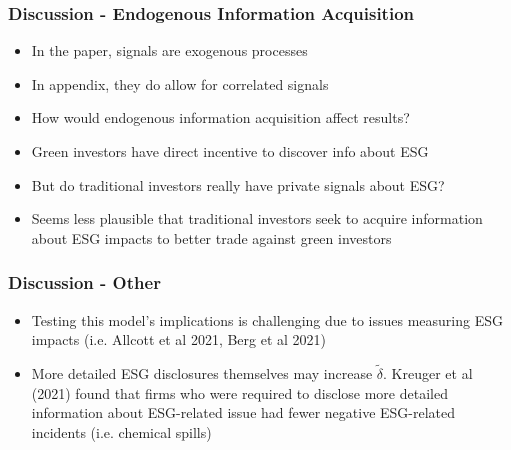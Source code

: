 \documentclass{beamer}
\begin{document}
\begin{frame}
\frametitle{Discussion - Endogenous Information Acquisition}
\begin{itemize}[<+->]
\item In the paper, signals are exogenous processes
\bigskip
\item In appendix, they do allow for correlated signals
\bigskip
\item How would endogenous information acquisition affect results?
\bigskip
\item Green investors have direct incentive to discover info about ESG
\bigskip
\item But do traditional investors really have private signals about ESG?
\bigskip
\item Seems less plausible that traditional investors seek to acquire information about ESG impacts to better trade against green investors
\end{itemize}
\end{frame}

\begin{frame}
\frametitle{Discussion - Other}
\begin{itemize}[<+->]
\item Testing this model's implications is challenging due to issues measuring ESG impacts (i.e. Allcott et al 2021, Berg et al 2021)
\bigskip
\item More detailed ESG disclosures themselves may increase $\tilde\delta$. Kreuger et al (2021) found that firms who were required to disclose more detailed information about ESG-related issue had fewer negative ESG-related incidents (i.e. chemical spills)
\end{itemize}
\end{frame}
\end{document}
